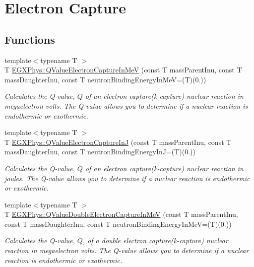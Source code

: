 \hypertarget{group___e_g_x_phys-_q_value-_electron_capture}{}\section{Electron Capture}
\label{group___e_g_x_phys-_q_value-_electron_capture}
\subsection*{Functions}
\begin{DoxyCompactItemize}
\item 
{\footnotesize template$<$typename T $>$ }\\T \mbox{\hyperlink{group___e_g_x_phys-_q_value-_electron_capture_ga9cd8502b6101614c17114e9710cdcf6c}{E\+G\+X\+Phys\+::\+Q\+Value\+Electron\+Capture\+In\+MeV}} (const T mass\+Parent\+Inu, const T mass\+Daughter\+Inu, const T neutron\+Binding\+Energy\+In\+MeV=(T)(0.))
\begin{DoxyCompactList}\small\item\em Calculates the Q-\/value, $Q$ of an electron capture(k-\/capture) nuclear reaction in megaelectron volts. The Q-\/value allows you to determine if a nuclear reaction is endothermic or exothermic. \end{DoxyCompactList}\item 
{\footnotesize template$<$typename T $>$ }\\T \mbox{\hyperlink{group___e_g_x_phys-_q_value-_electron_capture_gaf2569f9c706130b730dcf55695780263}{E\+G\+X\+Phys\+::\+Q\+Value\+Electron\+Capture\+InJ}} (const T mass\+Parent\+Inu, const T mass\+Daughter\+Inu, const T neutron\+Binding\+Energy\+InJ=(T)(0.))
\begin{DoxyCompactList}\small\item\em Calculates the Q-\/value, $Q$ of an electron capture(k-\/capture) nuclear reaction in joules. The Q-\/value allows you to determine if a nuclear reaction is endothermic or exothermic. \end{DoxyCompactList}\item 
{\footnotesize template$<$typename T $>$ }\\T \mbox{\hyperlink{group___e_g_x_phys-_q_value-_electron_capture_gab16ac92ae27b2c0c96c7abc35f949cb8}{E\+G\+X\+Phys\+::\+Q\+Value\+Double\+Electron\+Capture\+In\+MeV}} (const T mass\+Parent\+Inu, const T mass\+Daughter\+Inu, const T neutron\+Binding\+Energy\+In\+MeV=(T)(0.))
\begin{DoxyCompactList}\small\item\em Calculates the Q-\/value, $Q$, of a double electron capture(k-\/capture) nuclear reaction in megaelectron volts. The Q-\/value allows you to determine if a nuclear reaction is endothermic or exothermic. \end{DoxyCompactList}\item 

\end{DoxyCompactItemize}
